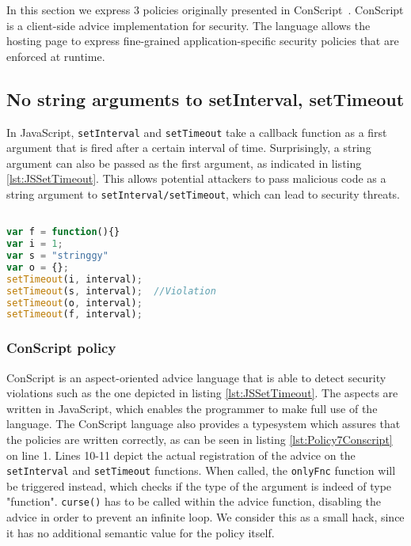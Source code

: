 In this section we express 3 policies originally presented in ConScript~\cite{ConScript}. ConScript is a client-side advice implementation for security. The language allows the hosting page to express fine-grained application-specific security policies that are enforced at runtime.

\subsection{No string arguments to setInterval, setTimeout}


In JavaScript, \texttt{setInterval} and \texttt{setTimeout} take a callback function as a first argument that is fired after a certain interval of time. Surprisingly, a string argument can also be passed as the first argument, as indicated in listing \ref{lst:JSSetTimeout}. This allows potential attackers to pass malicious code as a string argument to \texttt{setInterval/setTimeout}, which can lead to security threats.


\begin{lstlisting}[label={lst:JSSetTimeout},language=JavaScript,caption=No string arguments to setTimeout,mathescape=true]  % float=t?

var f = function(){}
var i = 1;
var s = "stringgy"
var o = {};
setTimeout(i, interval);
setTimeout(s, interval);  //Violation
setTimeout(o, interval);
setTimeout(f, interval);
\end{lstlisting}

\subsubsection*{ConScript policy}

ConScript is an aspect-oriented advice language that is able to detect security violations such as the one depicted in listing \ref{lst:JSSetTimeout}. The aspects are written in JavaScript, which enables the programmer to make full use of the language. The ConScript language also provides a typesystem which assures that the policies are written correctly, as can be seen in listing \ref{lst:Policy7Conscript} on line 1. Lines 10-11 depict the actual registration of the advice on the \texttt{setInterval} and \texttt{setTimeout} functions. When called, the \texttt{onlyFnc} function will be triggered instead, which checks if the type of the argument is indeed of type "function". \texttt{curse()} has to be called within the advice function, disabling the advice in order to prevent an infinite loop. We consider this as a small hack, since it has no additional semantic value for the policy itself.


